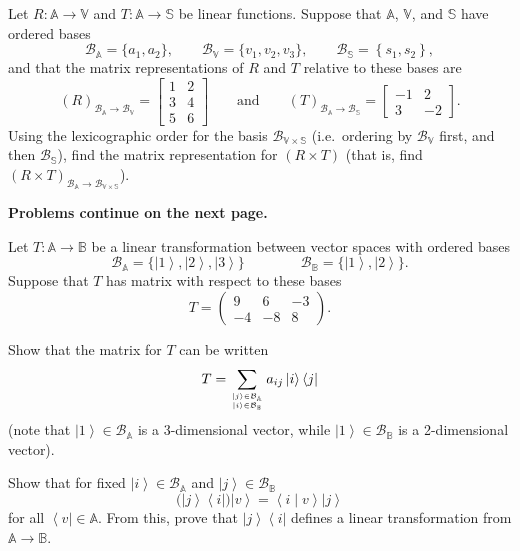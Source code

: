 \documentclass[oneside]{amsart}  %
\newcommand{\m}[1]{\mathbb{#1}}      %
\newcommand{\alg}[1]{\m{#1}}         %
\newcommand{\cl}[1]{\mathcal{#1}}    %
\theoremstyle{plain}
\theoremstyle{definition}
\theoremstyle{remark}
\newcommand{\bmat}[1]{ \begin{bmatrix} #1 \end{bmatrix} }
\newcommand{\pmat}[1]{ \begin{pmatrix} #1 \end{pmatrix} }
\newcommand{\stack}[2]{\genfrac{}{}{0pt}{}{#1}{#2}}
\numberwithin{equation}{section}  %
\newcommand{\bra}[1]{ \left< #1 \right| }
\newcommand{\ket}[1]{ \left| #1 \right> }
\newcommand{\bracket}[2]{ \left< #1 \mid #2 \right> }
\begin{document}
\begin{questions}
\begin{questions}
  \item Let $R: \alg{A} \to \alg{V}$ and $T:\alg{A}\to \alg{S}$ be linear
  functions. Suppose that $\alg{A}$, $\alg{V}$, and $\alg{S}$ have ordered bases
  \[
    \cl{B}_{\alg{A}}
      = \big\{ a_1, a_2 \big\},
    \qquad
    \cl{B}_{\alg{V}}
      = \big\{ v_1, v_2, v_3 \big\},
    \qquad
    \cl{B}_{\alg{S}}
      = \left\{ s_1, s_2 \right\},
  \]
  and that the matrix representations of $R$ and $T$ relative to these bases
  are
  \[
    (R)_{\cl{B}_{\alg{A}}\to \cl{B}_{\alg{V}} }
      = \bmat{ 1 & 2 \\
               3 & 4 \\
               5 & 6 }
    \qquad\text{and}\qquad
    (T)_{\cl{B}_{\alg{A}}\to \cl{B}_{\alg{S}} }
      = \bmat{ -1 &  2 \\
                3 & -2 }.
  \]
  Using the lexicographic order for the basis $\cl{B}_{\alg{V}\times \alg{S}}$
  (i.e.\ ordering by $\cl{B}_{\alg{V}}$ first, and then $\cl{B}_{\alg{S}}$),
  find the matrix representation for $(R\times T)$ (that is, find $(R\times
  T)_{\cl{B}_{\alg{A}}\to \cl{B}_{\alg{V}\times \alg{S}} }$).
\end{questions}

\vfill \begin{center} \textbf{Problems continue on the next page.} \end{center} \vfill
\newpage

\item Let $T: \alg{A} \to \alg{B}$ be a linear transformation between vector
spaces with ordered bases
\[
  \cl{B}_{\alg{A}}
    = \big\{ \ket{1}, \ket{2}, \ket{3} \big\}
  \qquad\qquad
  \cl{B}_{\alg{B}}
    = \big\{ \ket{1}, \ket{2} \big\}.
\]
Suppose that $T$ has matrix with respect to these bases
\[
  T
  = \pmat{ 9  & 6  & -3 \\
           -4 & -8 & 8 }.
\]
\begin{questions}
  \item Show that the matrix for $T$ can be written
  \[
    T
    = \sum_{\stack{ \ket{j}\in \cl{B}_{\alg{A}} }{ \ket{i}\in \cl{B}_{\alg{B}} }}
    a_{ij} \ket{i}\bra{j}
  \]
  (note that $\ket{1}\in \cl{B}_{\alg{A}}$ is a 3-dimensional vector, while
  $\ket{1}\in \cl{B}_{\alg{B}}$ is a 2-dimensional vector).

  \item Show that for fixed $\ket{i}\in \cl{B}_{\alg{A}}$ and $\ket{j}\in
  \cl{B}_{\alg{B}}$
  \[
    \big( \ket{j} \bra{i} \big) \ket{v}
    = \bracket{i}{v} \ket{j}
  \]
  for all $\bra{v} \in \alg{A}$. From this, prove that $\ket{j}\bra{i}$ defines a
  linear transformation from $\alg{A}\to \alg{B}$.


\end{questions}
\end{questions}
\end{document}
